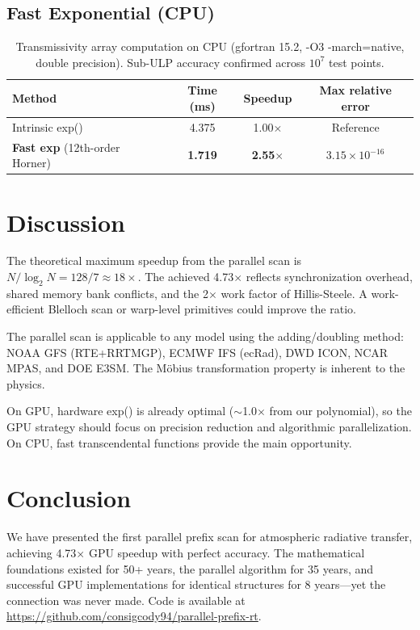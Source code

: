\documentclass[12pt,letterpaper]{article}
\begin{document}
\subsection{Fast Exponential (CPU)}

\begin{table}[h]
\centering
\begin{tabular}{lccc}
\toprule
Method & Time (ms) & Speedup & Max relative error \\
\midrule
Intrinsic exp() & 4.375 & 1.00$\times$ & Reference \\
\textbf{Fast exp} (12th-order Horner) & \textbf{1.719} & \textbf{2.55$\times$} & $3.15 \times 10^{-16}$ \\
\bottomrule
\end{tabular}
\caption{Transmissivity array computation on CPU (gfortran 15.2, -O3 -march=native, double precision). Sub-ULP accuracy confirmed across $10^7$ test points.}
\label{tab:fastexp}
\end{table}

\section{Discussion}

The theoretical maximum speedup from the parallel scan is $N/\log_2 N = 128/7 \approx 18\times$. The achieved 4.73$\times$ reflects synchronization overhead, shared memory bank conflicts, and the 2$\times$ work factor of Hillis-Steele. A work-efficient Blelloch scan or warp-level primitives could improve the ratio.

The parallel scan is applicable to any model using the adding/doubling method: NOAA GFS (RTE+RRTMGP), ECMWF IFS (ecRad), DWD ICON, NCAR MPAS, and DOE E3SM. The M\"{o}bius transformation property is inherent to the physics.

On GPU, hardware exp() is already optimal ($\sim$1.0$\times$ from our polynomial), so the GPU strategy should focus on precision reduction and algorithmic parallelization. On CPU, fast transcendental functions provide the main opportunity.

\section{Conclusion}

We have presented the first parallel prefix scan for atmospheric radiative transfer, achieving 4.73$\times$ GPU speedup with perfect accuracy. The mathematical foundations existed for 50+ years, the parallel algorithm for 35 years, and successful GPU implementations for identical structures for 8 years---yet the connection was never made. Code is available at \url{https://github.com/consigcody94/parallel-prefix-rt}.
\end{document}
